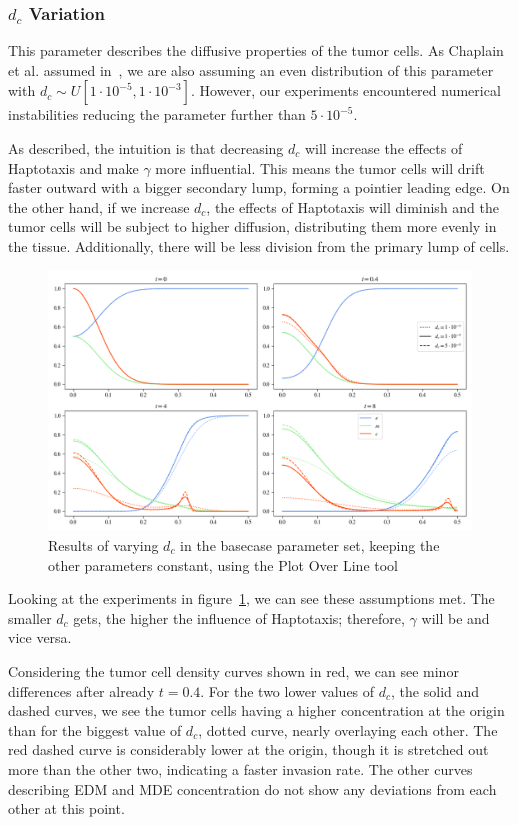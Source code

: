 \subsubsection*{$d_c$ Variation}
This parameter describes the diffusive properties of the tumor cells. As Chaplain et al. assumed in~\cite{STEPHANOU200696}, we are also assuming an even distribution of this parameter with $d_c \sim U[1\cdot 10^{-5}, 1\cdot 10^{-3}]$. However, our experiments encountered numerical instabilities reducing the parameter further than $5 \cdot 10^{-5}$. 

As described, the intuition is that decreasing $d_c$ will increase the effects of Haptotaxis and make $\gamma$ more influential. This means the tumor cells will drift faster outward with a bigger secondary lump, forming a pointier leading edge. On the other hand, if we increase $d_c$, the effects of Haptotaxis will diminish and the tumor cells will be subject to higher diffusion, distributing them more evenly in the tissue. Additionally, there will be less division from the primary lump of cells. 
\begin{figure}[h!]
 \centering
 \includegraphics[width=\textwidth]{resources/images/dc_variation.png}
 \caption{Results of varying $d_c$ in the basecase parameter set, keeping the other parameters constant, using the Plot Over Line tool}
 \label{fig:dc_variation}
\end{figure}
Looking at the experiments in figure~\ref{fig:dc_variation}, we can see these assumptions met. The smaller $d_c$ gets, the higher the influence of Haptotaxis; therefore, $\gamma$ will be and vice versa.

Considering the tumor cell density curves shown in red, we can see minor differences after already $t=0.4$. For the two lower values of $d_c$, the solid and dashed curves, we see the tumor cells having a higher concentration at the origin than for the biggest value of $d_c$, dotted curve, nearly overlaying each other. The red dashed curve is considerably lower at the origin, though it is stretched out more than the other two, indicating a faster invasion rate. The other curves describing EDM and MDE concentration do not show any deviations from each other at this point.

